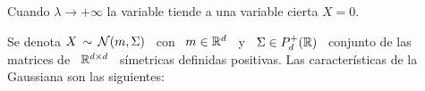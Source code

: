 Cuando $\lambda \to +\infty$ la variable tiende a una variable cierta $X = 0$.





\label{Sssec:MP:Gaussiana}

Se denota $X \, \sim \, \mathcal{N}(m,\Sigma)$ \  con \ $m \in \mathbb{R}^d$ \ y \ $\Sigma \in
P_d^+(\mathbb{R})$  \  conjunto  de  las   matrices  de  \  $\mathbb{R}^{d  \times  d}$  \
s\'imetricas definidas positivas. Las  caracter\'isticas de la Gaussiana son las
siguientes:

